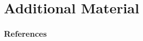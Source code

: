 \documentclass{beamer}
\begin{document}
\appendix

\section{Additional Material}
\begin{frame}
  \frametitle{References}
  
 \tiny{}
\end{frame}
\end{document}
